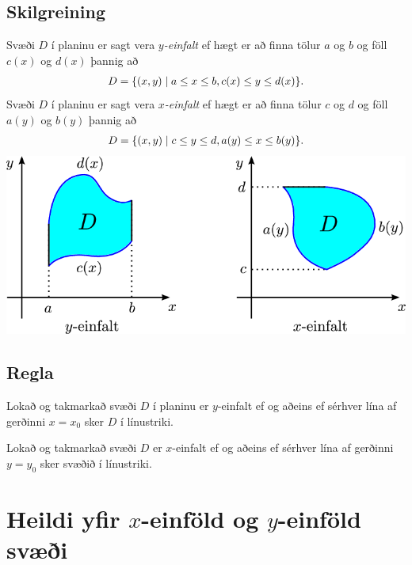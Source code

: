\documentclass[a4paper,10pt,icelandic]{sphinxmanual}
\begin{document}
\subsection{Skilgreining}
\label{Kafli4:id6}
Svæði \(D\) í planinu er sagt vera \(y\)\emph{-einfalt} ef hægt er
að finna tölur \(a\) og \(b\) og föll \(c(x)\) og
\(d(x)\) þannig að
\begin{gather}
\begin{split}\displaystyle D=\{(x,y)\mid a\leq x\leq b, c(x)\leq y\leq d(x)\}.\end{split}\notag
\end{gather}
Svæði \(D\) í planinu er sagt vera \(x\)\emph{-einfalt} ef hægt er
að finna tölur \(c\) og \(d\) og föll \(a(y)\) og
\(b(y)\) þannig að
\begin{gather}
\begin{split}\displaystyle D=\{(x,y)\mid c\leq y\leq d, a(y)\leq x\leq b(y)\}.\end{split}\notag
\end{gather}
{\hfill\includegraphics[width=0.650\linewidth]{einfalt.png}\hfill}


\subsection{Regla}
\label{Kafli4:regla}
Lokað og takmarkað svæði \(D\) í planinu er \(y\)-einfalt ef og
aðeins ef sérhver lína af gerðinni \(x=x_0\) sker \(D\) í
línustriki.

Lokað og takmarkað svæði \(D\) er \(x\)-einfalt ef og aðeins ef
sérhver lína af gerðinni \(y=y_0\) sker svæðið í línustriki.


\section{Heildi yfir \(x\)-einföld og \(y\)-einföld svæði}
\label{Kafli4:heildi-yfir-einfold-og-einfold-svaei}
\end{document}
